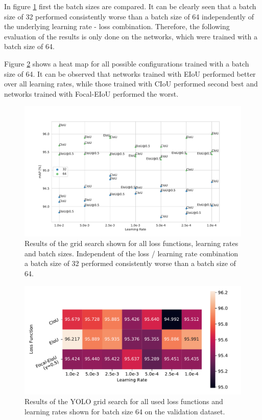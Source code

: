 In figure \ref{fig:yolo_grid_bs_compare_results} first the batch sizes are compared.
It can be clearly seen that a batch size of 32 performed consistently worse than a batch size of 64 independently of the underlying learning rate - loss combination.
Therefore, the following evaluation of the results is only done on the networks, which were trained with a batch size of 64.



Figure \ref{fig:yolo_grid_heat_results} shows a heat map for all possible configurations trained with a batch size of 64.
It can be observed that networks trained with \ac{EIoU} performed better over all learning rates, while those trained with \ac{CIoU} performed second best and networks trained with Focal-\ac{EIoU} performed the worst.

\begin{figure}[t!]
\begin{center}
    \includegraphics[width=14cm]{imgs/yolo_grid_bs_compare.pdf}
    \caption{Results of the grid search shown for all loss functions, learning rates and batch sizes. Independent of the loss / learning rate combination a batch size of 32 performed consistently worse than a batch size of 64.}
    \label{fig:yolo_grid_bs_compare_results}
\end{center}
\end{figure}

\begin{figure}[b!]
\begin{center}
    \includegraphics[width=15cm]{imgs/yolo_grid_heat.pdf}
    \caption{Results of the YOLO grid search for all used loss functions and learning rates shown for batch size 64 on the validation dataset.}
    \label{fig:yolo_grid_heat_results}
\end{center}
\end{figure}

